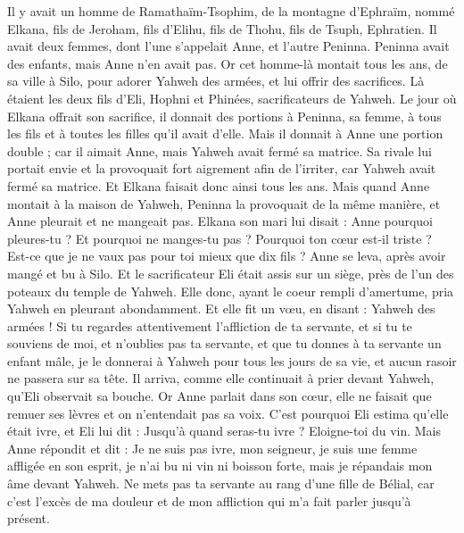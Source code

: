 \begin{multicols}{2}
\VerseOne{}Il y avait un homme de Ramathaïm-Tsophim, de la montagne d'Ephraïm, nommé Elkana, fils de Jeroham, fils d'Elihu, fils de Thohu, fils de Tsuph, Ephratien.
Il avait deux femmes, dont l'une s'appelait Anne, et l'autre Peninna. Peninna avait des enfants, mais Anne n'en avait pas.
Or cet homme-là montait tous les ans, de sa ville à Silo, pour adorer Yahweh des armées, et lui offrir des sacrifices. Là étaient les deux fils d'Eli, Hophni et Phinées, sacrificateurs de Yahweh.
Le jour où Elkana offrait son sacrifice, il donnait des portions à Peninna, sa femme, à tous les fils et à toutes les filles qu'il avait d'elle.
Mais il donnait à Anne une portion double ; car il aimait Anne, mais Yahweh avait fermé sa matrice.
Sa rivale lui portait envie et la provoquait fort aigrement afin de l'irriter, car Yahweh avait fermé sa matrice.
Et Elkana faisait donc ainsi tous les ans. Mais quand Anne montait à la maison de Yahweh, Peninna la provoquait de la même manière, et Anne pleurait et ne mangeait pas.
Elkana son mari lui disait : Anne pourquoi pleures-tu ? Et pourquoi ne manges-tu pas ? Pourquoi ton cœur est-il triste ? Est-ce que je ne vaux pas pour toi mieux que dix fils ?
Anne se leva, après avoir mangé et bu à Silo. Et le sacrificateur Eli était assis sur un siège, près de l'un des poteaux du temple de Yahweh.
Elle donc, ayant le coeur rempli d'amertume, pria Yahweh en pleurant abondamment.
Et elle fit un vœu, en disant : Yahweh des armées ! Si tu regardes attentivement l'affliction de ta servante, et si tu te souviens de moi, et n'oublies pas ta servante, et que tu donnes à ta servante un enfant mâle, je le donnerai à Yahweh pour tous les jours de sa vie, et aucun rasoir ne passera sur sa tête.
Il arriva, comme elle continuait à prier devant Yahweh, qu'Eli observait sa bouche.
Or Anne parlait dans son cœur, elle ne faisait que remuer ses lèvres et on n'entendait pas sa voix. C'est pourquoi Eli estima qu'elle était ivre,
et Eli lui dit : Jusqu'à quand seras-tu ivre ? Eloigne-toi du vin.
Mais Anne répondit et dit : Je ne suis pas ivre, mon seigneur, je suis une femme affligée en son esprit, je n'ai bu ni vin ni boisson forte, mais je répandais mon âme devant Yahweh.
Ne mets pas ta servante au rang d'une fille de Bélial, car c'est l'excès de ma douleur et de mon affliction qui m'a fait parler jusqu'à présent.

\end{multicols}
